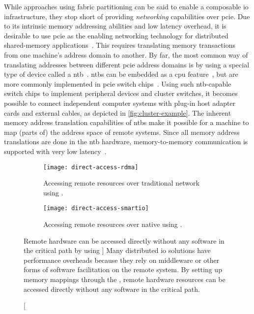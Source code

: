 While approaches using fabric partitioning can be said to enable a composable \gls{io} infrastructure, they stop short of providing \emph{networking} capabilities over \gls{pcie}.
%
Due to its intrinsic memory addressing abilities and low latency overhead, it is desirable to use \gls{pcie} as the enabling networking technology for distributed shared-memory applications~\cite{Shim2018,whitepaper:Regula2004,url:Meduri2011}.
%
This requires translating memory transactions from one machine's address domain to another.
%
By far, the most common way of translating addresses between different \gls{pcie} address domains is by using a special type of device called a \gls{ntb}~\cite{whitepaper:PLX,whitepaper:Regula2004,Hou2013,Tu2014}.
%
\Glspl{ntb} can be embedded as a \gls{cpu} feature~\cite{whitepaper:Sullivan2010,url:LinuxNTB-AMD}, but are more commonly implemented in \gls{pcie} switch chips~\cite{whitepaper:PLX,pex8733}.
%
Using such \gls{ntb}-capable switch chips to implement peripheral devices and cluster switches, it becomes possible to connect independent computer systems with plug-in host adapter cards and external cables, as depicted in \cref{fig:cluster-example}.
%
The inherent memory address translation capabilities of \glspl{ntb} make it possible for a machine to map (parts of) the address space of remote systems.
%
Since all memory address translations are done in the \gls{ntb} hardware, memory-to-memory communication is supported with very low latency~\cite{Lim2019,Tu2014}.



\begin{figure}
    \centering
    \begin{subfigure}{\linewidth}
        \centering
        \texttt{[image: direct-access-rdma]}
        \caption{Accessing remote resources over traditional network using .}
    \end{subfigure}
    \par\vspace{5mm}
    \begin{subfigure}{\linewidth}
        \centering
        \texttt{[image: direct-access-smartio]}
        \caption{Accessing remote resources over native  using .}
    \end{subfigure}
    \caption
    [Remote hardware can be accessed directly without any software in the critical path by using ]
    {Many distributed \gls{io} solutions have performance overheads because they rely on \gls{middleware} or other forms of software facilitation on the remote system. By setting up memory mappings through the , remote hardware resources can be accessed directly without any software in the critical path.}
    \label{fig:direct-access}
\end{figure}




